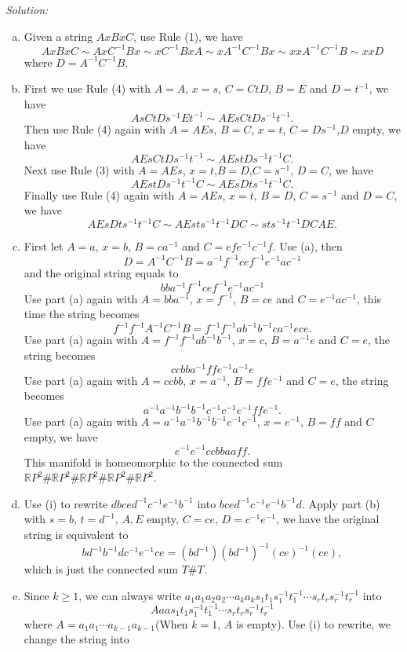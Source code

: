 \documentclass[a4paper, 12pt]{article}
\newenvironment{solution}
    {\textit{Solution:}}
    {}
\begin{document}
\begin{solution}
\begin{enumerate}[(a)]
\item Given a string \(AxBxC\), use Rule (1), we have 
\[AxBxC\sim AxC^{-1}Bx\sim xC^{-1}BxA\sim xA^{-1}C^{-1}Bx\sim xxA^{-1}C^{-1}B\sim xxD\]
where \(D=A^{-1}C^{-1}B\).
\item First we use Rule (4) with \(A=A\), \(x=s\), \(C=CtD\), \(B=E\) and \(D=t^{-1}\), we have 
\[AsCtDs^{-1}Et^{-1}\sim AEsCtDs^{-1}t^{-1}.\]
Then use Rule (4) again with \(A=AEs\), \(B=C\), \(x=t\), \(C=Ds^{-1}\),\(D\) empty, we have 
\[AEsCtDs^{-1}t^{-1}\sim AEstDs^{-1}t^{-1}C.\]
Next use Rule (3) with \(A=AEs\), \(x=t\),\(B=D\),\(C=s^{-1}\), \(D=C\), we have 
\[AEstDs^{-1}t^{-1}C\sim AEsDts^{-1}t^{-1}C.\]
Finally use Rule (4) again with \(A=AEs\), \(x=t\), \(B=D\), \(C=s^{-1}\) and \(D=C\), we have 
\[AEsDts^{-1}t^{-1}C\sim AEsts^{-1}t^{-1}DC\sim sts^{-1}t^{-1}DCAE.\]
\item First let \(A=a\), \(x=b\), \(B=ca^{-1}\) and \(C=efe^{-1}c^{-1}f\). Use (a), then 
\[D=A^{-1}C^{-1}B=a^{-1}f^{-1}cef^{-1}e^{-1}ac^{-1}\]
and the original string equals to 
\[bba^{-1}f^{-1}cef^{-1}e^{-1}ac^{-1}\]
Use part (a) again with \(A=bba^{-1}\), \(x=f^{-1}\), \(B=ce\) and \(C=e^{-1}ac^{-1}\), this time the string becomes
\[f^{-1}f^{-1}A^{-1}C^{-1}B=f^{-1}f^{-1}ab^{-1}b^{-1}ca^{-1}ece.\]
Use part (a) again with \(A=f^{-1}f^{-1}ab^{-1}b^{-1}\), \(x=c\), \(B=a^{-1}e\) and \(C=e\), the string becomes 
\[ccbba^{-1}ffe^{-1}a^{-1}e\]
Use part (a) again with \(A=ccbb\), \(x=a^{-1}\), \(B=ffe^{-1}\) and \(C=e\), the string becomes 
\[a^{-1}a^{-1}b^{-1}b^{-1}c^{-1}c^{-1}e^{-1}ffe^{-1}.\]
Use part (a) again with \(A=a^{-1}a^{-1}b^{-1}b^{-1}c^{-1}c^{-1}\), \(x=e^{-1}\), \(B=ff\) and \(C\) empty, we have 
\[e^{-1}e^{-1}ccbbaaff.\]
This manifold is homeomorphic to the connected sum \(\mathbb{R}P^2\# \mathbb{R}P^2\# \mathbb{R}P^2\# \mathbb{R}P^2\# \mathbb{R}P^2\).
\item Use (i) to rewrite \(dbced^{-1}c^{-1}e^{-1}b^{-1}\) into \(bced^{-1}c^{-1}e^{-1}b^{-1}d\). Apply part (b) with \(s=b\), \(t=d^{-1}\), \(A,E\) empty, \(C=ce\), \(D=c^{-1}e^{-1}\), 
we have the original string is equivalent to  
\[bd^{-1}b^{-1}dc^{-1}e^{-1}ce=(bd^{-1})(bd^{-1})^{-1}(ce)^{-1}(ce),\]
which is just the connected sum \(T\# T\).
\item Since \(k\geq 1\), we can always write \(a_1a_1a_2a_2\cdots a_ka_ks_1t_1s_1^{-1}t_1^{-1}\cdots s_rt_rs_r^{-1}t_r^{-1}\) into 
\[Aaas_1t_1s_1^{-1}t_1^{-1}\cdots s_rt_rs_r^{-1}t_r^{-1}\] 
where \(A=a_1a_1\cdots a_{k-1}a_{k-1}\)(When \(k=1\), \(A\) is empty). Use (i) to rewrite, we change the string into 

\end{enumerate}
\end{solution}
\end{document}
